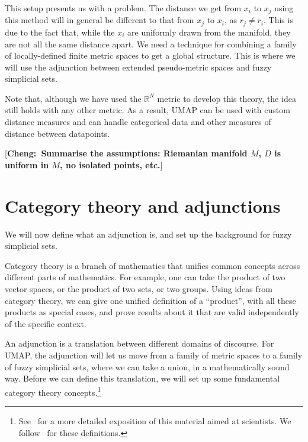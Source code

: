 \documentclass[a4paper,11pt,leqno]{article} \usepackage{amsmath}
\newcommand{\RR}{\mathbb{R}} \newcommand{\QQ}{\mathbb{Q}}
\theoremstyle{definition}
\newcommand{\cheng}[1]{ {\color{purple}[{\bf Cheng:~{#1}}]} }
\begin{document}
This setup presents us with a problem.
The distance we get from $x_i$ to $x_j$ using this method will in general be
different to that from $x_j$ to $x_i$, as $r_j\not= r_i$.
This is due to the fact that, while the $x_i$ are uniformly drawn from the
manifold, they are not all the same distance apart.
We need a technique for combining a family of locally-defined finite metric
spaces to get a global structure.
This is where we will use the adjunction between extended pseudo-metric spaces
and fuzzy simplicial sets.

Note that, although we have used the $\RR^N$ metric to develop this theory, the
idea still holds with any other metric.
As a result, UMAP can be used with custom distance measures and can handle
categorical data and other measures of distance between datapoints.

\cheng{Summarise the assumptions: Riemanian manifold $M$, $D$ is uniform in $M$,
no isolated points, etc.}

\section{Category theory and adjunctions}
\label{section_category_theory}

We will now define what an adjunction is, and set up the background for fuzzy
simplicial sets.

Category theory is a branch of mathematics that unifies common concepts across
different parts of mathematics.
For example, one can take the product of two vector spaces, or the product of
two sets, or two groups.
Using ideas from category theory, we can give one unified definition of a
``product'', with all these products as special cases, and prove results about
it that are valid independently of the specific context.

An adjunction is a translation between different domains of discourse.
For UMAP, the adjunction will let us move from a family of metric spaces to
a family of fuzzy simplicial sets, where we can take a union, in
a mathematically sound way.
Before we can define this translation, we will set up some fundamental category
theory concepts.\footnote{
  See~\cite{Spivak18} for a more detailed exposition of this material aimed at
  scientists.  We follow~\cite{Riehl} for these definitions.
}
\end{document}
